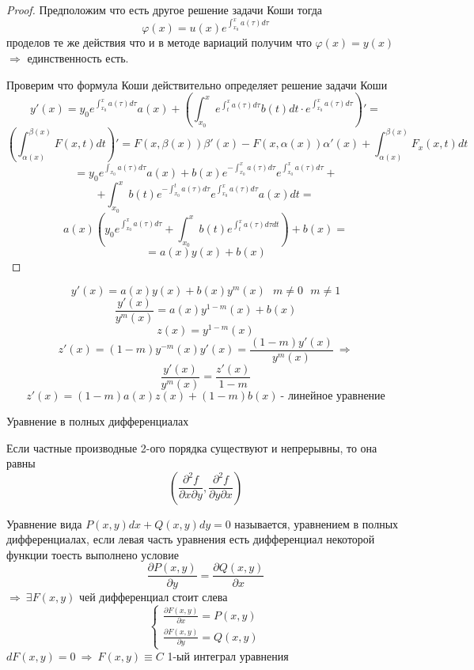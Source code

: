 \begin{proof}
  Предположим что есть другое решение задачи Коши тогда
  $$
  \varphi(x) = u(x) e^{\int_{x_0}^x a(\tau)d\tau}
  $$
  проделов те же действия что и в методе вариаций получим что
  $\varphi(x) = y(x)$ $\Rightarrow$ единственность есть.

  Проверим что формула Коши действительно определяет решение задачи Коши
  $$
  y'(x) = y_0 e^{\int_{x_0}^x a(\tau) d\tau} a(x) + \left( \int_{x_0}^x
  e^{\int_{t}^x a(\tau) d\tau} b(t)dt \cdot
  e^{\int_{x_0}^x a(\tau)d\tau} \right)' =
  $$
  $$
  \left( \int_{\alpha(x)}^{\beta(x)} F(x, t) dt \right)' =
  F(x, \beta(x)) \beta'(x) - F(x, \alpha(x)) \alpha'(x) +
  \int_{\alpha(x)}^{\beta(x)} F_x(x, t)dt
  $$
  $$
  = y_0 e^{\int_{x_0} a(\tau)d\tau} a(x) + b(x) e^{-\int_{x_0}^x a(\tau) d\tau}
  e^{\int_{x_0}^x a(\tau) d\tau} +
  $$
  $$
  + \int_{x_0}^x b(t)
  e^{-\int_{x_0}^t a(\tau) d\tau} e^{\int_{x_0}^x a(\tau) d\tau} a(x) dt =
  $$
  $$
  a(x) \left( y_0 e^{\int_{x_0}^x a(\tau) d\tau} + \int_{x_0}^x b(t)
  e^{\int_t^x a(\tau) d\tau dt} \right) + b(x) =
  $$
  $$
  = a(x)y(x) + b(x)
  $$
\end{proof}

\begin{block}
  $$
  y'(x) = a(x)y(x) + b(x)y^m(x) ~~~ m \not= 0 ~~~ m \not= 1
  $$
  $$
  \frac{y'(x)}{y^m(x)} = a(x) y^{1 - m}(x) + b(x)
  $$
  $$
  z(x) = y^{1 - m}(x)
  $$
  $$
  z'(x) = (1 - m) y^{-m}(x) y'(x) = \frac{(1-m)y'(x)}{y^m(x)} ~ \Rightarrow
  $$
  $$
  \frac{y'(x)}{y^m(x)} = \frac{z'(x)}{1 - m}
  $$
  $$
  z'(x) = (1 - m) a(x)z(x) + (1 - m)b(x) ~
  \text{- линейное уравнение}
  $$
\end{block}

\begin{title}[\Large]
  Уравнение в полных дифференциалах
\end{title}

Если частные производные 2-ого порядка существуют и непрерывны, то она равны
$$
\left( \frac{\partial^2 f}{\partial x \partial y},
\frac{\partial^2 f}{\partial y \partial x} \right)
$$

\begin{define}
  Уравнение вида $P(x, y)dx + Q(x, y)dy = 0$ называется, уравнением в полных
  дифференциалах, если левая часть уравнения есть дифференциал некоторой
  функции тоесть выполнено условие
  $$
  \frac{\partial P(x, y)}{\partial y} = \frac{\partial Q(x, y)}{\partial x}
  $$
  $\Rightarrow ~ \exists F(x, y)$ чей дифференциал стоит слева
  $$
  \left\{
  \begin{array}{l}
    \frac{\partial F(x, y)}{\partial x} = P(x, y) \\
    \frac{\partial F(x, y)}{\partial y} = Q(x, y)
  \end{array}
  \right.
  $$
  $dF(x, y) = 0 ~ \Rightarrow ~ F(x, y) \equiv C$ 1-ый интеграл уравнения
\end{define}

